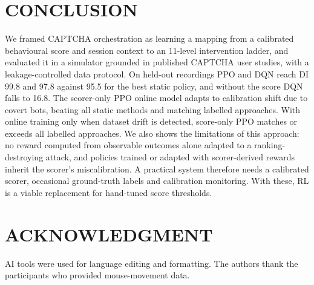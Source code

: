 \documentclass{ieeetj}
\begin{document}
\section{CONCLUSION}
We framed CAPTCHA orchestration as learning a mapping from a calibrated behavioural score and session context to an 11-level intervention ladder, and evaluated it in a simulator grounded in published CAPTCHA user studies, with a leakage-controlled data protocol.
On held-out recordings PPO and DQN reach DI 99.8 and 97.8 against 95.5 for the best static policy, and without the score DQN falls to 16.8. 
The scorer-only PPO online model adapts to calibration shift due to covert bots, beating all static methods and matching labelled approaches.  
With online training only when dataset drift is detected, score-only PPO matches or exceeds all labelled approaches.
We also shows the limitations of this approach: no reward computed from observable outcomes alone adapted to a ranking-destroying attack, and policies trained or adapted with scorer-derived rewards inherit the scorer's miscalibration.
A practical system therefore needs a calibrated scorer, occasional ground-truth labels and calibration monitoring. 
With these, RL is a viable replacement for hand-tuned score thresholds.

\section*{ACKNOWLEDGMENT}
AI tools were used for language editing and formatting. 
The authors thank the participants who provided mouse-movement data.
\end{document}
